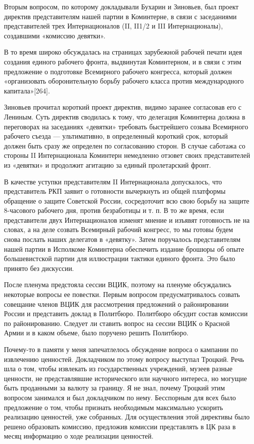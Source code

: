 \documentclass[12pt, a4paper, openany]{book}
\begin{document}
Вторым вопросом, по которому докладывали Бухарин и Зиновьев, был проект директив представителям нашей партии в Коминтерне, в связи с заседаниями представителей трех Интернационалов (II, II1/2 и III Интернационалы), создавшими «комиссию девятки».

В то время широко обсуждалась на страницах зарубежной рабочей печати идея создания единого рабочего фронта, выдвинутая Коминтерном, и в связи с этим предложение о подготовке Всемирного рабочего конгресса, который должен «организовать оборонительную борьбу рабочего класса против международного капитала»[264].

Зиновьев прочитал короткий проект директив, видимо заранее согласовав его с Лениным. Суть директив сводилась к тому, что делегация Коминтерна должна в переговорах на заседаниях «девятки» требовать быстрейшего созыва Всемирного рабочего съезда — ультимативно, в определенный короткий срок, который должен быть сразу же определен по согласованию сторон. В случае саботажа со стороны II Интернационала Коминтерн немедленно отзовет своих представителей из «девятки» и продолжит агитацию за единый пролетарский фронт.

В качестве уступки представителям II Интернационала допускалось, что представитель РКП заявит о готовности вычеркнуть из общей платформы обращение о защите Советской России, сосредоточит всю свою борьбу на защите 8-часового рабочего дня, против безработицы и т. п. В то же время, если представители двух Интернационалов изменят мнение и изъявят готовность не на словах, а на деле созвать Всемирный рабочий конгресс, то мы готовы будем снова послать наших делегатов в «девятку». Затем поручалось представителям нашей партии в Исполкоме Коминтерна обеспечить издание брошюры об опыте большевистской партии для иллюстрации тактики единого фронта. Это было принято без дискуссии.

После пленума предстояла сессии ВЦИК, поэтому на пленуме обсуждались некоторые вопросы ее повестки. Первым вопросом предусматривалось созвать совещание членов ВЦИК для рассмотрения предложений о районировании России и представить доклад в Политбюро. Политбюро обсудит состав комиссии по районированию. Следует ли ставить вопрос на сессии ВЦИК о Красной Армии и в каком объеме, было поручено решить Политбюро.

Почему-то в памяти у меня запечатлелось обсуждение вопроса о кампании по извлечению ценностей. Докладчиком по этому вопросу выступал Троцкий. Речь шла о том, чтобы извлекать из государственных учреждений, музеев разные ценности, не представлявшие исторического или научного интереса, но могущие быть проданными за валюту за границу. Я не знал, почему Троцкий этим вопросом занимался и был докладчиком по нему. Бесспорным для всех было предложение о том, чтобы признать необходимым максимально ускорить реализацию ценностей, уже собранных. Для осуществления этой директивы было решено образовать комиссию, предложив комиссии представлять в ЦК раза в месяц информацию о ходе реализации ценностей.
\end{document}
